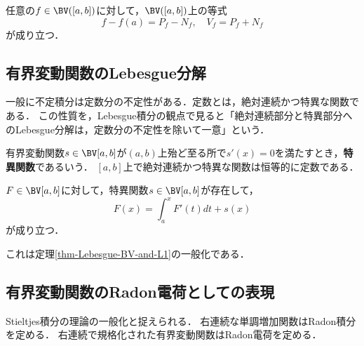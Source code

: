\documentclass[uplatex, dvipdfmx]{jsreport}
\begin{document}
\begin{theorem}[有界変動関数のJordan分解]
    任意の$f\in\BV([a,b])$に対して，$\BV([a,b])$上の等式
    \[f-f(a)=P_f-N_f,\quad V_f=P_f+N_f\]
    が成り立つ．
\end{theorem}

\subsection{有界変動関数のLebesgue分解}

\begin{tcolorbox}[colframe=ForestGreen, colback=ForestGreen!10!white,breakable,colbacktitle=ForestGreen!40!white,coltitle=black,fonttitle=\bfseries\sffamily,
title=]
    一般に不定積分は定数分の不定性がある．定数とは，絶対連続かつ特異な関数である．
    この性質を，Lebesgue積分の観点で見ると「絶対連続部分と特異部分へのLebesgue分解は，定数分の不定性を除いて一意」という．
\end{tcolorbox}

\begin{definition}
    有界変動関数$s\in\BV[a,b]$が$(a,b)$上殆ど至る所で$s'(x)=0$を満たすとき，\textbf{特異関数}であるいう．
    $[a,b]$上で絶対連続かつ特異な関数は恒等的に定数である．
\end{definition}

\begin{example}
    
\end{example}

\begin{corollary}
    $F\in\BV[a,b]$に対して，特異関数$s\in\BV[a,b]$が存在して，
    \[F(x)=\int^x_aF'(t)dt+s(x)\]
    が成り立つ．
\end{corollary}
\begin{remarks}
    これは定理\ref{thm-Lebesgue-BV-and-L1}の一般化である．
\end{remarks}

\subsection{有界変動関数のRadon電荷としての表現}

\begin{tcolorbox}[colframe=ForestGreen, colback=ForestGreen!10!white,breakable,colbacktitle=ForestGreen!40!white,coltitle=black,fonttitle=\bfseries\sffamily,
title=]
    Stieltjes積分の理論の一般化と捉えられる．
    右連続な単調増加関数はRadon積分を定める．
    右連続で規格化された有界変動関数はRadon電荷を定める．
\end{tcolorbox}
\end{document}
